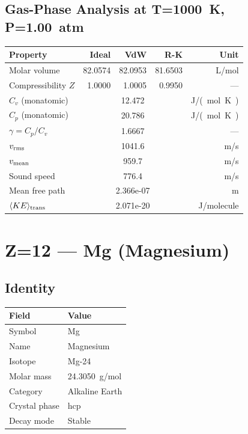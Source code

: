 \documentclass[11pt,a4paper]{article}
\begin{document}
\subsection{Gas-Phase Analysis at T=\SI{1000}{K}, P=\SI{1.00}{atm}}
\begin{tabular}{lrrrr}
  \toprule
  Property & Ideal & VdW & R-K & Unit \\
  \midrule
  Molar volume & 82.0574 & 82.0953 & 81.6503 & \si{L/mol} \\
  Compressibility $Z$ & 1.0000 & 1.0005 & 0.9950 & --- \\
  \midrule
  $C_v$ (monatomic) & \multicolumn{3}{c}{12.472} & \si{J/(mol.K)} \\
  $C_p$ (monatomic) & \multicolumn{3}{c}{20.786} & \si{J/(mol.K)} \\
  $\gamma = C_p/C_v$ & \multicolumn{3}{c}{1.6667} & --- \\
  $v_{\rm rms}$ & \multicolumn{3}{c}{1041.6} & \si{m/s} \\
  $v_{\rm mean}$ & \multicolumn{3}{c}{959.7} & \si{m/s} \\
  Sound speed & \multicolumn{3}{c}{776.4} & \si{m/s} \\
  Mean free path & \multicolumn{3}{c}{2.366e-07} & \si{m} \\
  $\langle KE \rangle_{\rm trans}$ & \multicolumn{3}{c}{2.071e-20} & \si{J/molecule} \\
  \bottomrule
\end{tabular}

\newpage

\section{Z=12 --- Mg (Magnesium)}
\label{sec:Z12}

\subsection{Identity}
\begin{tabular}{ll}
  \toprule
  Field & Value \\
  \midrule
  Symbol & Mg \\
  Name & Magnesium \\
  Isotope & Mg-24 \\
  Molar mass & \SI{24.3050}{g/mol} \\
  Category & Alkaline Earth \\
  Crystal phase & hcp \\
  Decay mode & Stable \\
  \bottomrule
\end{tabular}
\end{document}
